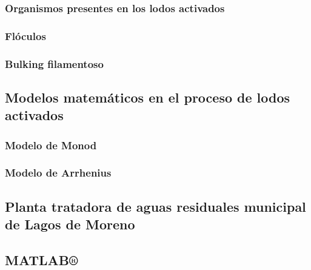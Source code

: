 \subsubsection{Organismos presentes en los lodos activados}
\subsubsection{Flóculos}
\subsubsection{Bulking filamentoso}
\subsection{Modelos matemáticos en el proceso de lodos activados}
\subsubsection{Modelo de Monod}
\subsubsection{Modelo de Arrhenius}
\subsection{Planta tratadora de aguas residuales municipal de Lagos de Moreno}
\subsection{MATLAB®}
